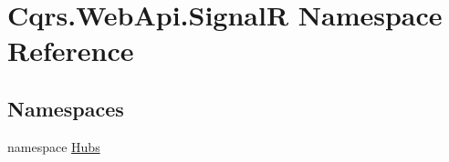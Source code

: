 \hypertarget{namespaceCqrs_1_1WebApi_1_1SignalR}{}\section{Cqrs.\+Web\+Api.\+SignalR Namespace Reference}
\label{namespaceCqrs_1_1WebApi_1_1SignalR}
\subsection*{Namespaces}
\begin{DoxyCompactItemize}
\item 
namespace \hyperlink{namespaceCqrs_1_1WebApi_1_1SignalR_1_1Hubs}{Hubs}
\end{DoxyCompactItemize}
